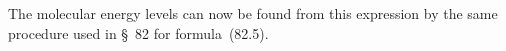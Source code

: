 The molecular energy levels can now be found from this expression by the same procedure used in \S~82 for formula~(82.5).

